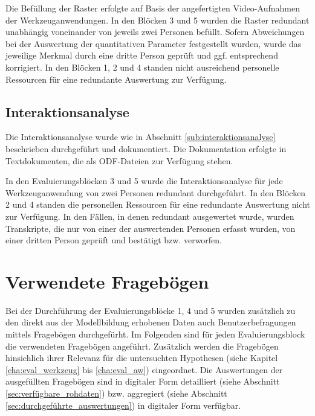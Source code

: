 Die Befüllung der Raster erfolgte auf Basis der angefertigten Video-Aufnahmen der Werkzeuganwendungen. In den Blöcken 3 und 5 wurden die Raster redundant unabhängig voneinander von jeweils zwei Personen befüllt. Sofern Abweichungen bei der Auswertung der quantitativen Parameter festgestellt wurden, wurde das jeweilige Merkmal durch eine dritte Person geprüft und ggf. entsprechend korrigiert. In den Blöcken 1, 2 und 4 standen nicht ausreichend personelle Ressourcen für eine redundante Auswertung zur Verfügung.

\subsection{Interaktionsanalyse}

Die Interaktionsanalyse wurde wie in Abschnitt \ref{sub:interaktionsanalyse} beschrieben durchgeführt und dokumentiert. Die Dokumentation erfolgte in Textdokumenten, die als \gls{ODF}-Dateien zur Verfügung stehen.

In den Evaluierungsblöcken 3 und 5 wurde die Interaktionsanalyse für jede Werkzeuganwendung von zwei Personen redundant durchgeführt. In den Blöcken 2 und 4 standen die personellen Ressourcen für eine redundante Auswertung nicht zur Verfügung. In den Fällen, in denen redundant ausgewertet wurde, wurden Transkripte, die nur von einer der auswertenden Personen erfasst wurden, von einer dritten Person geprüft und bestätigt bzw. verworfen.


\section{Verwendete Fragebögen} %
\label{sec:frageboegen}

Bei der Durchführung der Evaluierungsblöcke 1, 4 und 5 wurden zusätzlich zu den direkt aus der Modellbildung erhobenen Daten auch Benutzerbefragungen mittels Fragebögen durchgefürht. Im Folgenden sind für jeden Evaluierungsblock die verwendeten Fragebögen angeführt. Zusätzlich werden die Fragebögen hinsichlich ihrer Relevanz für die untersuchten Hypothesen (siehe Kapitel \ref{cha:eval_werkzeug} bis \ref{cha:eval_aw}) eingeordnet. Die Auswertungen der ausgefüllten Fragebögen sind in digitaler Form detailliert (siehe Abschnitt \ref{sec:verfügbare_rohdaten}) bzw. aggregiert (siehe Abschnitt \ref{sec:durchgeführte_auswertungen}) in digitaler Form verfügbar.


\clearpage
